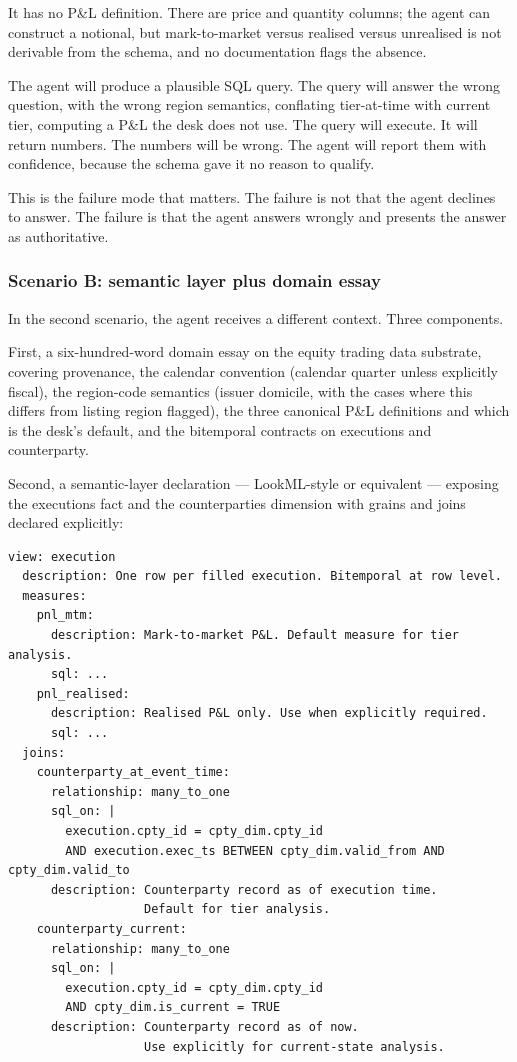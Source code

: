 \documentclass[11pt,a4paper]{article}
\begin{document}
It has no P\&L definition. There are price and quantity columns; the agent can construct a notional, but mark-to-market versus realised versus unrealised is not derivable from the schema, and no documentation flags the absence.

The agent will produce a plausible SQL query. The query will answer the wrong question, with the wrong region semantics, conflating tier-at-time with current tier, computing a P\&L the desk does not use. The query will execute. It will return numbers. The numbers will be wrong. The agent will report them with confidence, because the schema gave it no reason to qualify.

This is the failure mode that matters. The failure is not that the agent declines to answer. The failure is that the agent answers wrongly and presents the answer as authoritative.

\subsubsection{Scenario B: semantic layer plus domain essay}

In the second scenario, the agent receives a different context. Three components.

First, a six-hundred-word domain essay on the equity trading data substrate, covering provenance, the calendar convention (calendar quarter unless explicitly fiscal), the region-code semantics (issuer domicile, with the cases where this differs from listing region flagged), the three canonical P\&L definitions and which is the desk's default, and the bitemporal contracts on executions and counterparty.

Second, a semantic-layer declaration --- LookML-style or equivalent --- exposing the executions fact and the counterparties dimension with grains and joins declared explicitly:

\begin{lstlisting}[language=yamlext]
view: execution
  description: One row per filled execution. Bitemporal at row level.
  measures:
    pnl_mtm:
      description: Mark-to-market P&L. Default measure for tier analysis.
      sql: ...
    pnl_realised:
      description: Realised P&L only. Use when explicitly required.
      sql: ...
  joins:
    counterparty_at_event_time:
      relationship: many_to_one
      sql_on: |
        execution.cpty_id = cpty_dim.cpty_id
        AND execution.exec_ts BETWEEN cpty_dim.valid_from AND cpty_dim.valid_to
      description: Counterparty record as of execution time.
                   Default for tier analysis.
    counterparty_current:
      relationship: many_to_one
      sql_on: |
        execution.cpty_id = cpty_dim.cpty_id
        AND cpty_dim.is_current = TRUE
      description: Counterparty record as of now.
                   Use explicitly for current-state analysis.
\end{lstlisting}
\end{document}
